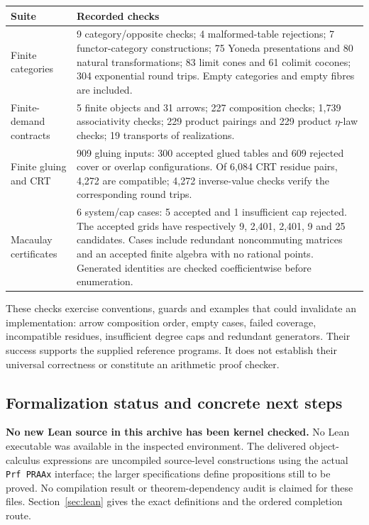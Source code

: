 \begin{longtable}{@{}P{.23\linewidth}P{.70\linewidth}@{}}
\toprule
Suite & Recorded checks\\
\midrule\endhead
Finite categories & 9 category/opposite checks; 4 malformed-table
rejections; 7 functor-category constructions; 75 Yoneda presentations and
80 natural transformations; 83 limit cones and 61 colimit cocones; 304
exponential round trips. Empty categories and empty fibres are included.\\
Finite-demand contracts & 5 finite objects and 31 arrows; 227 composition
checks; 1,739 associativity checks; 229 product pairings and 229 product
$\eta$-law checks; 19 transports of realizations.\\
Finite gluing and CRT & 909 gluing inputs: 300 accepted glued tables and
609 rejected cover or overlap configurations. Of 6,084 CRT residue pairs,
4,272 are compatible; 4,272 inverse-value checks verify the corresponding
round trips.\\
Macaulay certificates & 6 system/cap cases: 5 accepted and 1 insufficient
cap rejected. The accepted grids have respectively 9, 2,401, 2,401, 9 and
25 candidates. Cases include redundant noncommuting matrices and an accepted
finite algebra with no rational points. Generated identities are checked
coefficientwise before enumeration.\\
\bottomrule
\end{longtable}

These checks exercise conventions, guards and examples that could invalidate
an implementation: arrow composition order, empty cases, failed coverage,
incompatible residues, insufficient degree caps and redundant generators.
Their success supports the supplied reference programs. It does not establish
their universal correctness or constitute an arithmetic proof checker.

\subsection{Formalization status and concrete next steps}

\textbf{No new Lean source in this archive has been kernel checked.}
No Lean executable was available in the inspected environment. The delivered
object-calculus expressions are uncompiled source-level constructions using
the actual \texttt{Prf PRAAx} interface; the larger specifications define
propositions still to be proved. No compilation result or theorem-dependency
audit is claimed for these files. Section~\ref{sec:lean} gives the exact
definitions and the ordered completion route.

